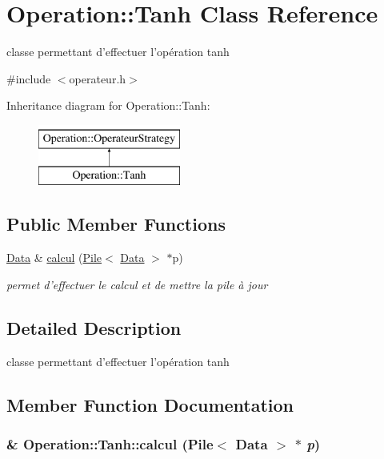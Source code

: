 \hypertarget{classOperation_1_1Tanh}{
\section{Operation::Tanh Class Reference}
\label{classOperation_1_1Tanh}
}


classe permettant d'effectuer l'opération tanh  




{\ttfamily \#include $<$operateur.h$>$}

Inheritance diagram for Operation::Tanh:\begin{figure}[H]
\begin{center}
\leavevmode
\includegraphics[height=2cm]{classOperation_1_1Tanh}
\end{center}
\end{figure}
\subsection*{Public Member Functions}
\begin{DoxyCompactItemize}
\item 
\hyperlink{classNombre_1_1Data}{Data} \& \hyperlink{classOperation_1_1Tanh_ae3f578c4fe041ab32596652570b85efa}{calcul} (\hyperlink{classPile}{Pile}$<$ \hyperlink{classNombre_1_1Data}{Data} $>$ $\ast$p)
\begin{DoxyCompactList}\small\item\em permet d'effectuer le calcul et de mettre la pile à jour \item\end{DoxyCompactList}\end{DoxyCompactItemize}


\subsection{Detailed Description}
classe permettant d'effectuer l'opération tanh 

\subsection{Member Function Documentation}
\hypertarget{classOperation_1_1Tanh_ae3f578c4fe041ab32596652570b85efa}{
\subsubsection[{calcul}]{\& Operation::Tanh::calcul ({\bf Pile}$<$ {\bf Data} $>$ $\ast$ {\em p})}}
\label{classOperation_1_1Tanh_ae3f578c4fe041ab32596652570b85efa}


